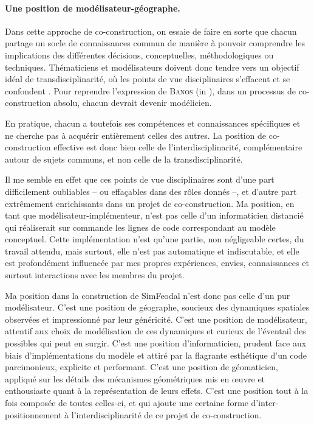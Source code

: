\paragraph{Une position de \og modélisateur-géographe\fg{}.}

Dans cette approche de co-construction, on essaie de faire en sorte que chacun partage un socle de connaissances commun de manière à pouvoir comprendre les implications des différentes décisions, conceptuelles, méthodologiques ou techniques.
Thématiciens et modélisateurs doivent donc tendre vers un objectif idéal de transdisciplinarité, où les points de vue disciplinaires s'effacent et se confondent \autocite[14]{gravier_deux_2018}.
Pour reprendre l'expression de \textsc{Banos} (in \textcite[]{ouriachi_lelaboration_2017}), dans un processus de co-construction absolu, chacun devrait devenir \og modélicien\fg{}.

En pratique, chacun a toutefois ses compétences et connaissances spécifiques et ne cherche pas à acquérir entièrement celles des autres.
La position de co-construction effective est donc bien celle de l'interdisciplinarité, complémentaire autour de sujets communs, et non celle de la transdisciplinarité.

Il me semble en effet que ces points de vue disciplinaires sont d'une part difficilement oubliables -- ou effaçables dans des rôles donnés --, et d'autre part extrêmement enrichissants dans un projet de co-construction.
Ma position, en tant que modélisateur-\og{}implémenteur\fg{}, n'est pas celle d'un informaticien distancié qui réaliserait sur commande les lignes de code correspondant au modèle conceptuel.
Cette implémentation n'est qu'une partie, non négligeable certes, du travail attendu, mais surtout, elle n'est pas automatique et indiscutable, et elle est profondément influencée par mes propres expériences, envies, connaissances et surtout interactions avec les membres du projet.

Ma position dans la construction de SimFeodal n'est donc pas celle d'un pur modélisateur.
C'est une position de géographe, soucieux des dynamiques spatiales observées et impressionné par leur généricité.
C'est une position de modélisateur, attentif aux choix de modélisation de ces dynamiques et curieux de l'éventail des possibles qui peut en surgir.
C'est une position d'informaticien, prudent face aux biais d'implémentations du modèle et attiré par la flagrante esthétique d'un code parcimonieux, explicite et performant.
C'est une position de géomaticien, appliqué sur les détails des mécanismes géométriques mis en œuvre et enthousiaste quant à la représentation de leurs effets.
C'est une position tout à la fois composée de toutes celles-ci, et qui ajoute une certaine forme d'inter-positionnement à l'interdisciplinarité de ce projet de co-construction.



